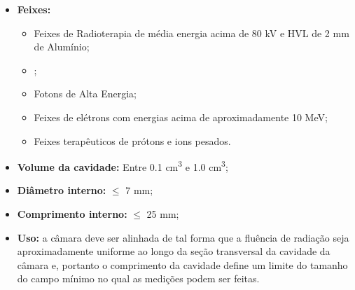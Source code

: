 \documentclass[11pt,a4paper]{article}
\newcounter{exemplo}
\begin{document}
	\begin{exemplo}
		\begin{itemize}[label=\textcolor{CarnationPink}{$\blacktriangleright$}]
			\item \textbf{Feixes:} 
				\begin{itemize}[label=\textcolor{CarnationPink}{$\star$}]
					\item Feixes de Radioterapia de média energia acima de 80 kV e HVL de 2 mm de Alumínio;
					\item {};
					\item Fotons de Alta Energia;
					\item Feixes de elétrons com energias acima de aproximadamente 10 MeV;
					\item Feixes terapêuticos de prótons e ions pesados.
				\end{itemize}
			\item \textbf{Volume da cavidade:} Entre 0.1 \unit{cm^3} e 1.0 \unit{cm^3};
			\item \textbf{Diâmetro interno:} $\leq$ 7 mm;
			\item \textbf{Comprimento interno:} $\leq$ 25 mm;
			\item \textbf{Uso:} a câmara deve ser alinhada de tal forma que a fluência de radiação seja aproximadamente uniforme ao longo da seção transversal da cavidade da câmara e, portanto o comprimento da cavidade  define um limite do tamanho do campo mínimo no qual as medições podem ser feitas.
		\end{itemize}		 
	\end{exemplo}
\end{document}
